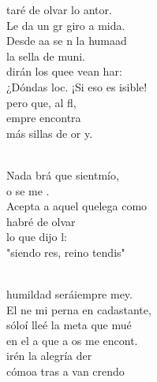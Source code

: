 \documentclass[12pt]{article}
\begin{document}
\begin{multicols*}{2}
\begin{cancion}%
	taré de olvar lo antor.\\
	Le da un gr giro a mida.\\
	Desde aa se n la humaad\\
	la sella de muni.\\
	dirán los quee vean har:\\
	¿Dóndas loc. ¡Si eso es isible!\\
	pero  que, al fl, \\
	empre encontra \\
	más sillas de or y.\\\jump\\
	\begin{chorus}%
	Nada brá que sientmío,\\
	o se me .\\
	Acepta a aquel quelega como  \\
	 habré de olvar  \\
	lo que dijo l:\\
	"siendo res,  reino tendis"\\
	\end{chorus}%
	\jump\\
	humildad seráiempre mey.\\
	El ne mi perna en cadastante,\\
	sóloí lleé la meta que mué \\
	en el a que a os me encont. \\
	irén la alegría der  \\
	cómoa tras a van crendo  \\

\end{cancion}
\end{multicols*}
\end{document}
